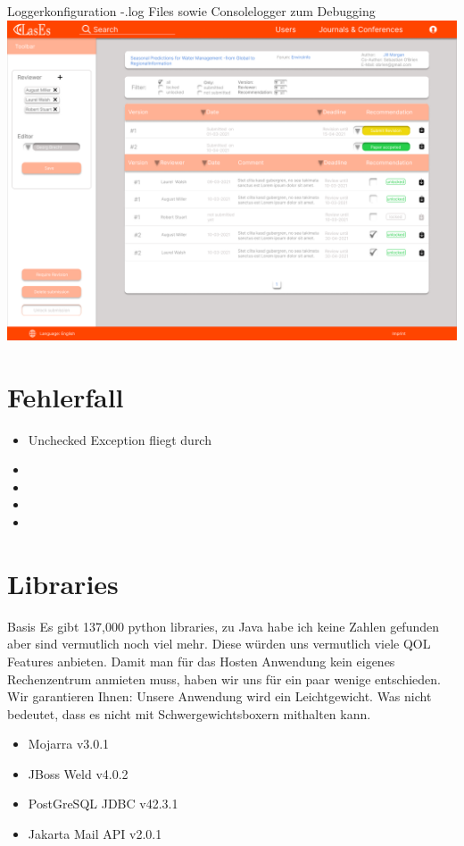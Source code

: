 \documentclass{beamer}
\begin{document}
    \begin{frame}{Loggerkonfiguration}
        -.log Files sowie Consolelogger zum Debugging
        \centering
        \includegraphics[height=0.75\textheight]{../../docs/Pflichtenheft/graphics/Submission-png}
    \end{frame}


    \section{Fehlerfall}
    \begin{frame}
        \begin{itemize}
            \item Unchecked Exception fliegt durch %
            \item %
            \item
            \item
            \item %
        \end{itemize}
    \end{frame}


    \section{Libraries}
    \begin{frame}{Basis}
        Es gibt 137,000 python libraries, zu Java habe ich keine Zahlen gefunden aber sind vermutlich noch viel mehr.
        Diese würden uns vermutlich viele QOL Features anbieten.
        Damit man für das Hosten Anwendung kein eigenes Rechenzentrum anmieten muss,
        haben wir uns für ein paar wenige entschieden.
        Wir garantieren Ihnen: Unsere Anwendung wird ein Leichtgewicht.
        Was nicht bedeutet, dass es nicht mit Schwergewichtsboxern mithalten kann.
        \begin{itemize}
            \item Mojarra v3.0.1
            \item JBoss Weld v4.0.2
            \item PostGreSQL JDBC v42.3.1
            \item Jakarta Mail API v2.0.1
        \end{itemize}
    \end{frame}
\end{document}
